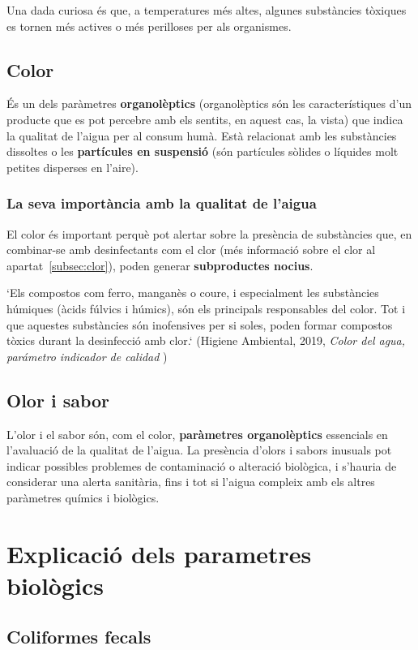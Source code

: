 Una dada curiosa és que, a temperatures més altes, algunes substàncies tòxiques es tornen més actives o més perilloses per als organismes. \cite{UCM}
\subsection{Color} \label{subsec:color}
És un dels paràmetres \textbf{organolèptics} (organolèptics són les característiques d'un producte que es pot percebre amb els sentits, en aquest cas, la vista) que indica la qualitat de l'aigua per al consum humà. Està relacionat amb les substàncies dissoltes o les \textbf{partícules en suspensió} (són partícules sòlides o líquides molt petites disperses en l’aire).
\subsubsection{La seva importància amb la qualitat de l'aigua}
El color és important perquè pot alertar sobre la presència de substàncies que, en combinar-se amb desinfectants com el clor (més informació sobre el clor al apartat~\ref{subsec:clor}), poden generar \textbf{subproductes nocius}.

`Els compostos com ferro, manganès o coure, i especialment les substàncies húmiques (àcids fúlvics i húmics), són els principals responsables del color. Tot i que aquestes substàncies són inofensives per si soles, poden formar compostos tòxics durant la desinfecció amb clor.` (Higiene Ambiental, 2019, \textit{Color del agua, parámetro indicador de calidad} \cite{Color})

\subsection{Olor i sabor} \label{subsec:olorisabor}
L’olor i el sabor són, com el color, \textbf{paràmetres organolèptics} essencials en l’avaluació de la qualitat de l’aigua. La presència d’olors i sabors inusuals pot indicar possibles problemes de contaminació o alteració biològica, i s’hauria de considerar una alerta sanitària, fins i tot si l’aigua compleix amb els altres paràmetres químics i biològics.

\section{Explicació dels parametres biològics}
\subsection{Coliformes fecals} \label{subsec:coliformes}
